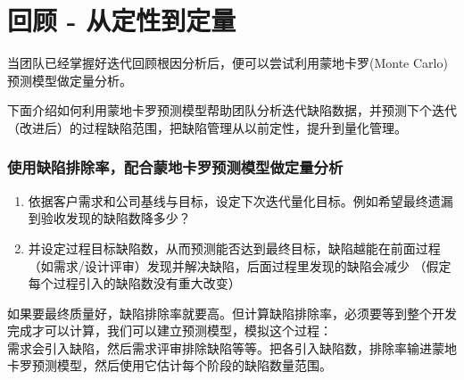 \chapter{回顾 - 从定性到定量} %

当团队已经掌握好迭代回顾根因分析后，便可以尝试利用蒙地卡罗(Monte
Carlo)预测模型做定量分析。

下面介绍如何利用蒙地卡罗预测模型帮助团队分析迭代缺陷数据，并预测下个迭代（改进后）的过程缺陷范围，把缺陷管理从以前定性，提升到量化管理。

\hypertarget{ux4f7fux7528ux7f3aux9677ux6392ux9664ux7387ux914dux5408ux8499ux5730ux5361ux7f57ux9884ux6d4bux6a21ux578bux505aux5b9aux91cfux5206ux6790}{%
\subsection{使用缺陷排除率，配合蒙地卡罗预测模型做定量分析}\label{ux4f7fux7528ux7f3aux9677ux6392ux9664ux7387ux914dux5408ux8499ux5730ux5361ux7f57ux9884ux6d4bux6a21ux578bux505aux5b9aux91cfux5206ux6790}}

\begin{enumerate}
\tightlist
\item
  依据客户需求和公司基线与目标，设定下次迭代量化目标。例如希望最终遗漏到验收发现的缺陷数降多少？
\item
  并设定过程目标缺陷数，从而预测能否达到最终目标，缺陷越能在前面过程（如需求/设计评审）发现并解决缺陷，后面过程里发现的缺陷会减少
  （假定每个过程引入的缺陷数没有重大改变）
\end{enumerate}

如果要最终质量好，缺陷排除率就要高。但计算缺陷排除率，必须要等到整个开发完成才可以计算，我们可以建立预测模型，模拟这个过程：\\
需求会引入缺陷，然后需求评审排除缺陷等等。把各引入缺陷数，排除率输进蒙地卡罗预测模型，然后使用它估计每个阶段的缺陷数量范围。


